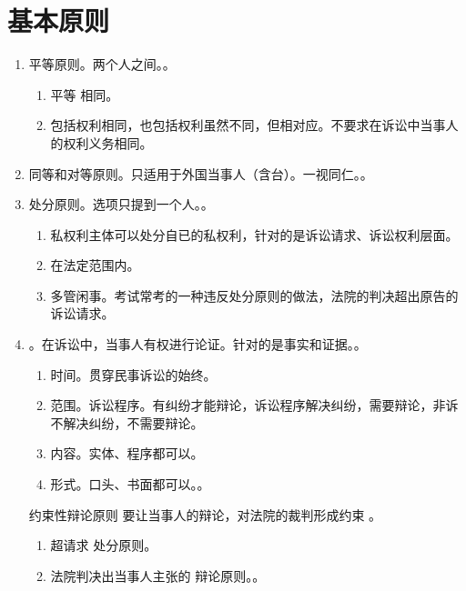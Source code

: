 \section{基本原则}
\begin{enumerate}
  \item 平等原则。两个人之间。。
        \begin{enumerate}
          \item 平等 \bdy 相同。
          \item 包括权利相同，也包括权利虽然不同，但相对应。不要求在诉讼中当事人的权利义务相同。
        \end{enumerate}
  \item 同等和对等原则。只适用于外国当事人（含台）。一视同仁。。
  \item 处分原则。选项只提到一个人。。
        \begin{enumerate}
          \item 私权利主体可以处分自已的私权利，针对的是诉讼请求、诉讼权利层面。
          \item 在法定范围内。
          \item 多管闲事。考试常考的一种违反处分原则的做法，法院的判决超出原告的诉讼请求。
        \end{enumerate}
  \item {}。在诉讼中，当事人有权进行论证。针对的是事实和证据。。
        \begin{enumerate}
          \item 时间。贯穿民事诉讼的始终。
          \item 范围。诉讼程序。有纠纷才能辩论，诉讼程序解决纠纷，需要辩论，非诉不解决纠纷，不需要辩论。
          \item 内容。实体、程序都可以。
          \item 形式。口头、书面都可以。。
        \end{enumerate}
        \begin{kk}{约束性辩论原则}
          要让当事人的辩论，对法院的裁判形成约束 \yjt {}。
          \begin{enumerate}
            \item 超请求 \yjt 处分原则。
            \item 法院判决出当事人主张的 \yjt 辩论原则。。

\end{enumerate}
\end{kk}
\end{enumerate}
